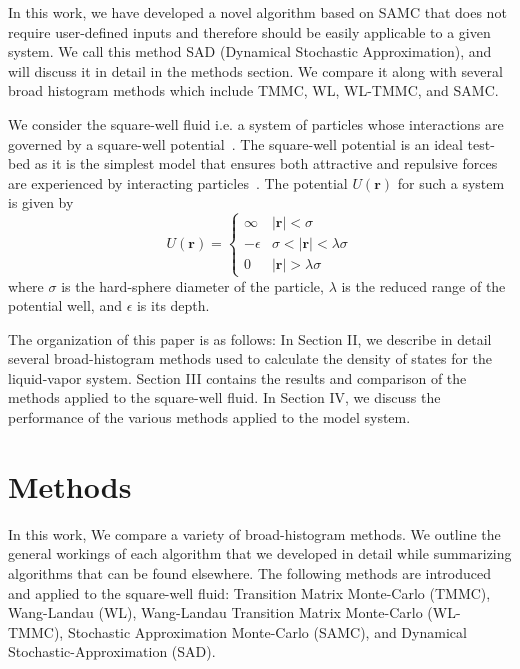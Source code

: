 \documentclass[letterpaper,twocolumn,amsmath,amssymb,pre,aps,10pt]{revtex4-1}
\begin{document}
In this work, we have developed a novel algorithm based on SAMC that
does not require user-defined inputs and therefore should be easily
applicable to a given system.  We call this method SAD (Dynamical
Stochastic Approximation), and will discuss it in detail in the methods
section. We compare it along with several broad histogram methods
which include TMMC, WL, WL-TMMC, and SAMC.

We consider the square-well fluid i.e. a system of particles whose
interactions are governed by a square-well
potential~\cite{singh2003surface, barker2004perturbationSW}.  The
square-well potential is an ideal test-bed as it is the simplest model
that ensures both attractive and repulsive forces are experienced by
interacting particles~\cite{barker1967-SW-perturbation, vega1992phase}.
The potential $U(\textbf{r})$ for such a system is given by
\begin{equation}
 U(\textbf{r})=\begin{cases} \infty &
 \lvert\textbf{r}\rvert< \sigma\\-\epsilon &
 \sigma<\lvert\textbf{r}\rvert<\lambda\sigma\\0 &
 \lvert\textbf{r}\rvert > \lambda\sigma\end{cases}
\end{equation}
where $\sigma$ is the hard-sphere diameter of the particle, $\lambda$ is the
reduced range of the potential well, and $\epsilon$ is its depth.

The organization of this paper is as follows: In Section II, we
describe in detail several broad-histogram methods used to calculate
the density of states for the liquid-vapor system.  Section III
contains the results and comparison of the methods applied to the
square-well fluid.  In Section IV, we discuss the performance of the
various methods applied to the model system.

\section{Methods}

In this work, We compare a variety of broad-histogram methods.  We
outline the general workings of each algorithm that we developed in
detail while summarizing algorithms that can be found elsewhere.  The
following methods are introduced and applied to the square-well fluid:
Transition Matrix Monte-Carlo (TMMC), Wang-Landau (WL), Wang-Landau
Transition Matrix Monte-Carlo (WL-TMMC), Stochastic Approximation
Monte-Carlo (SAMC), and Dynamical Stochastic-Approximation
(SAD).
\end{document}
